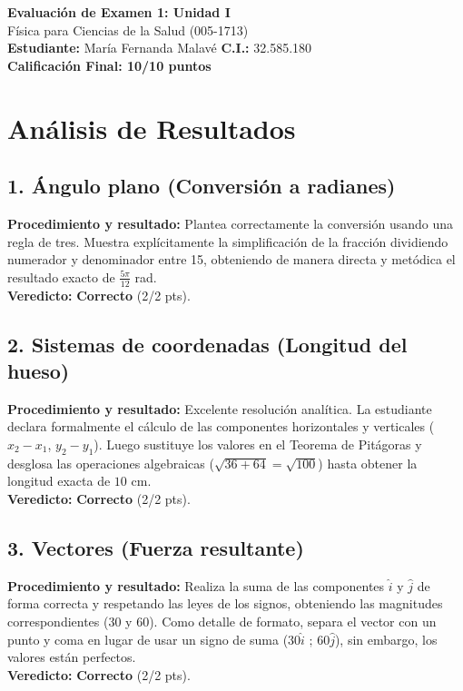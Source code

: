 \documentclass[12pt]{article}
\begin{document}
\begin{center}
    \Large \textbf{Evaluación de Examen 1: Unidad I} \\
    \large Física para Ciencias de la Salud (005-1713) \\
    \vspace{0.5cm}
    \textbf{Estudiante:} María Fernanda Malavé \quad \textbf{C.I.:} 32.585.180
    \vspace{0.3cm} \\
    \large \textbf{Calificación Final: 10/10 puntos}
\end{center}

\vspace{0.5cm}

\section*{Análisis de Resultados}

\subsection*{1. Ángulo plano (Conversión a radianes)}
\textbf{Procedimiento y resultado:} Plantea correctamente la conversión usando una regla de tres. Muestra explícitamente la simplificación de la fracción dividiendo numerador y denominador entre 15, obteniendo de manera directa y metódica el resultado exacto de $\frac{5\pi}{12}$ rad. \\
\textbf{Veredicto:} \textbf{Correcto} (2/2 pts).

\subsection*{2. Sistemas de coordenadas (Longitud del hueso)}
\textbf{Procedimiento y resultado:} Excelente resolución analítica. La estudiante declara formalmente el cálculo de las componentes horizontales y verticales ($x_2-x_1$, $y_2-y_1$). Luego sustituye los valores en el Teorema de Pitágoras y desglosa las operaciones algebraicas ($\sqrt{36+64} = \sqrt{100}$) hasta obtener la longitud exacta de $10$ cm. \\
\textbf{Veredicto:} \textbf{Correcto} (2/2 pts).

\subsection*{3. Vectores (Fuerza resultante)}
\textbf{Procedimiento y resultado:} Realiza la suma de las componentes $\hat{i}$ y $\hat{j}$ de forma correcta y respetando las leyes de los signos, obteniendo las magnitudes correspondientes (30 y 60). Como detalle de formato, separa el vector con un punto y coma en lugar de usar un signo de suma ($30\hat{i} \text{ ; } 60\hat{j}$), sin embargo, los valores están perfectos. \\
\textbf{Veredicto:} \textbf{Correcto} (2/2 pts).
\end{document}
